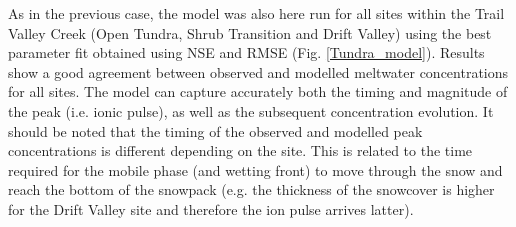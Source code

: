 \documentclass[authoryear,preprint,review,12pt]{elsarticle}
\begin{document}
As in the previous case, the model was also here run for all sites within the Trail Valley Creek (Open Tundra, Shrub Transition and Drift Valley) using the best parameter fit obtained using NSE and RMSE (Fig. \ref{Tundra_model}). Results show a good agreement between observed and modelled meltwater concentrations for all sites. The model can capture accurately both the timing and magnitude of the peak (i.e. ionic pulse), as well as the subsequent concentration evolution. It should be noted that the timing of the observed and modelled peak concentrations is different depending on the site. This is related to the time required for the mobile phase (and wetting front) to move through the snow and reach the bottom of the snowpack (e.g. the thickness of the snowcover is higher for the Drift Valley site and therefore the ion pulse arrives latter). \par






%
%
\end{document}
